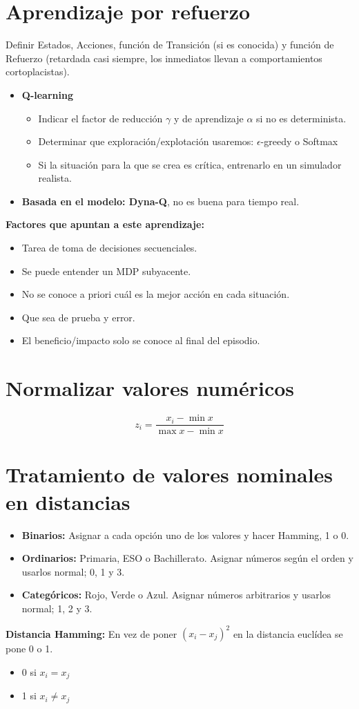 \documentclass[12pt, twoside, openright]{report} %
\begin{document}
\section{Aprendizaje por refuerzo}
Definir Estados, Acciones, función de Transición (si es conocida) y función de Refuerzo (retardada casi siempre, los inmediatos llevan a comportamientos cortoplacistas).

\begin{itemize}
	\item \textbf{Q-learning}
	      \begin{itemize}
		      \item Indicar el factor de reducción $\gamma$ y de aprendizaje $\alpha$ si no es determinista.
		      \item Determinar que exploración/explotación usaremos: $\epsilon$-greedy o Softmax
		      \item Si la situación para la que se crea es crítica, entrenarlo en un simulador realista.
	      \end{itemize}
	\item \textbf{Basada en el modelo: Dyna-Q}, no es buena para tiempo real.
\end{itemize}

\textbf{Factores que apuntan a este aprendizaje:}
\begin{itemize}
	\item Tarea de toma de decisiones secuenciales.
	\item Se puede entender un MDP subyacente.
	\item No se conoce a priori cuál es la mejor acción en cada situación.
	\item Que sea de prueba y error.
	\item El beneficio/impacto solo se conoce al final del episodio.
\end{itemize}

\section{Normalizar valores numéricos}
$$z_i = \frac{x_i - \min x}{\max x - \min x}$$

\section{Tratamiento de valores nominales en distancias}
\begin{itemize}
	\item \textbf{Binarios:} Asignar a cada opción uno de los valores y hacer Hamming, 1 o 0.
	\item \textbf{Ordinarios:} Primaria, ESO o Bachillerato. Asignar números según el orden y usarlos normal; 0, 1 y 3.
	\item \textbf{Categóricos:} Rojo, Verde o Azul. Asignar números arbitrarios y usarlos normal; 1, 2 y 3.
\end{itemize}
\textbf{Distancia Hamming:} En vez de poner $(x_i - x_j)^2$ en la distancia euclídea se pone 0 o 1.
\begin{itemize}
	\item 0 si $x_i = x_j$
	\item 1 si $x_i \neq x_j$
\end{itemize}
\end{document}
